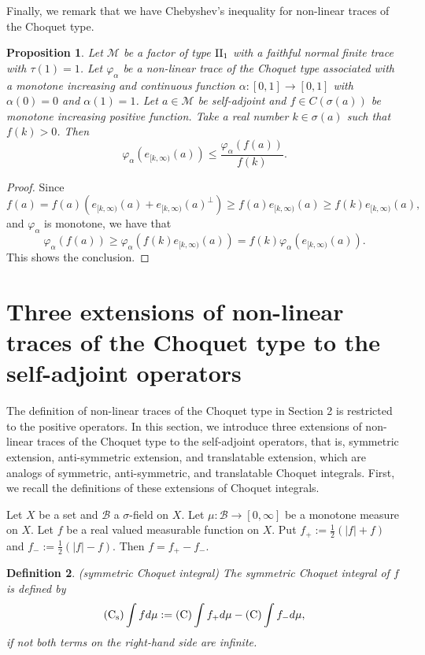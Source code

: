 \documentclass[a4paper,12pt]{amsart}
\newtheorem{definition}{Definition}[section]
\newtheorem{proposition}[definition]{Proposition}
\newcommand{\M}{\mathcal{M}}
\begin{document}
Finally, we remark that we have Chebyshev's inequality for non-linear traces of the Choquet type.  
\begin{proposition}
Let $\M$ be a factor of type ${\rm II}_1$ with a faithful normal finite trace with $\tau(1) = 1$. 
Let $\varphi_{\alpha}$  be a non-linear trace of the Choquet type associated with  
a monotone increasing and continuous function $\alpha: [0, 1] \rightarrow [0, 1]$  with $\alpha(0) = 0$ and 
$\alpha(1) = 1$. Let $a \in \M$ be self-adjoint and $f \in C(\sigma (a))$ be monotone increasing positive function.  
Take a real number $k \in \sigma (a)$ such that $f(k) >0$. Then 
$$
\varphi_{\alpha}(e_{[k,\infty)}(a)) \leq \frac{\varphi_{\alpha}(f(a))}{f(k)}. 
$$
\end{proposition}
\begin{proof} Since 
$$
f(a) = f(a)(e_{[k,\infty)}(a) + e_{[k,\infty)}(a)^{\perp}) \geq f(a)e_{[k,\infty)}(a) \geq f(k)e_{[k,\infty)}(a), 
$$
and $\varphi_{\alpha}$ is monotone, we have that 
$$
\varphi_{\alpha}(f(a)) \geq \varphi_{\alpha}(f(k)e_{[k,\infty)}(a)) = f(k) \varphi_{\alpha}(e_{[k,\infty)}(a)). 
$$
This shows the conclusion.

\end{proof}

\section{Three extensions of non-linear traces of the Choquet type to the self-adjoint operators}

The definition of non-linear traces of the Choquet type in Section 2 is restricted to the positive operators.  In this section, 
we introduce three extensions of non-linear traces of the Choquet type to the self-adjoint operators, that is, symmetric 
extension, anti-symmetric extension, and translatable extension, which are analogs of 
symmetric, anti-symmetric, and translatable Choquet integrals.  First, we recall the definitions of these extensions of Choquet integrals.  


Let $X$ be a set and ${\mathcal B}$ a $\sigma$-field on $X$.  
Let  $\mu: {\mathcal B} \rightarrow [0, \infty]$ be a monotone measure on $X$.
Let $f$ be a real valued measurable function on $X$.  Put $f_+ := \frac{1}{2} (|f| +f)$ and 
$f_- := \frac{1}{2} (|f| - f)$.  Then $f = f_+ - f_-$. 

\begin{definition} \rm (symmetric Choquet integral)
The symmetric Choquet integral of $f$ is defined by 
$$
{\rm (C_s)} \int f d\mu := {\rm (C)} \int f_+ d\mu - {\rm (C)} \int f_- d\mu,  
$$
if not both terms 
on the right-hand side are infinite. 
\end{definition}
\end{document}
